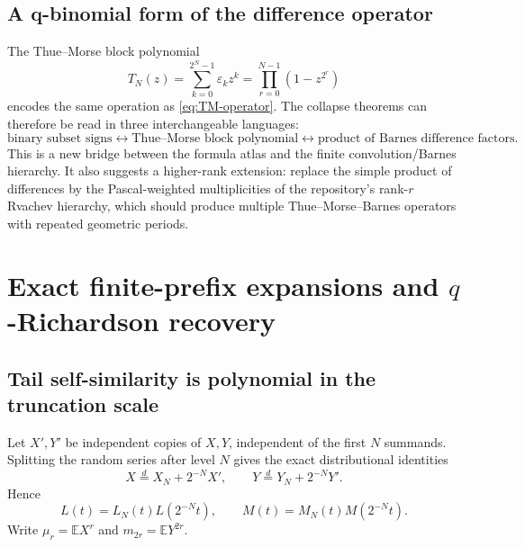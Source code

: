 \documentclass[11pt,oneside]{article}
\theoremstyle{frontier}
\theoremstyle{definition}
\theoremstyle{remark}
\newcommand{\eps}{\varepsilon}
\begin{document}
\subsection{A q-binomial form of the difference operator}

The Thue--Morse block polynomial
\begin{equation}
 T_N(z)=\sum_{k=0}^{2^N-1}\eps_kz^k
 =\prod_{r=0}^{N-1}(1-z^{2^r})
 \label{eq:TN}
\end{equation}
encodes the same operation as \eqref{eq:TM-operator}.  The collapse theorems can therefore be read
in three interchangeable languages:
\begin{equation}
 \text{binary subset signs}
 \longleftrightarrow
 \text{Thue--Morse block polynomial}
 \longleftrightarrow
 \text{product of Barnes difference factors}.
 \label{eq:three-languages}
\end{equation}
This is a new bridge between the formula atlas and the finite convolution/Barnes hierarchy.  It also
suggests a higher-rank extension: replace the simple product of differences by the Pascal-weighted
multiplicities of the repository's rank-$r$ Rvachev hierarchy, which should produce multiple
Thue--Morse--Barnes operators with repeated geometric periods.

\section{Exact finite-prefix expansions and \texorpdfstring{$q$}{q}-Richardson recovery}
\label{sec:richardson}

\subsection{Tail self-similarity is polynomial in the truncation scale}

Let $X',Y'$ be independent copies of $X,Y$, independent of the first $N$ summands.  Splitting the
random series after level $N$ gives the exact distributional identities
\begin{equation}
 X\overset{d}=X_N+2^{-N}X',
 \qquad
 Y\overset{d}=Y_N+2^{-N}Y'.
 \label{eq:tail-self-similarity}
\end{equation}
Hence
\begin{equation}
 L(t)=L_N(t)L(2^{-N}t),
 \qquad
 M(t)=M_N(t)M(2^{-N}t).
 \label{eq:finite-infinite-mgf}
\end{equation}
Write $\mu_r=\mathbb EX^r$ and $m_{2r}=\mathbb EY^{2r}$.
\end{document}
